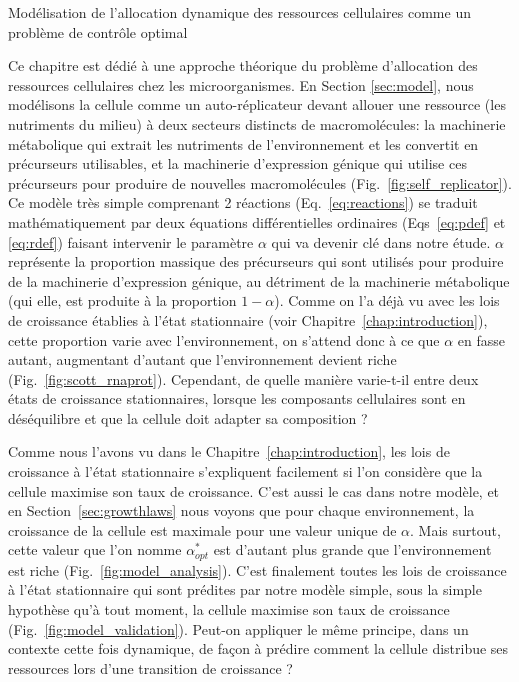 \begin{chapter_summary}{Modélisation de l'allocation dynamique des ressources cellulaires comme un problème de contrôle optimal}

Ce chapitre est dédié à une approche théorique du problème d'allocation des ressources cellulaires chez les microorganismes.
En Section \ref{sec:model}, nous modélisons la cellule comme un auto-réplicateur devant allouer une ressource (les nutriments du milieu) à deux secteurs distincts de macromolécules: la machinerie métabolique qui extrait les nutriments de l'environnement et les convertit en précurseurs utilisables, et la machinerie d'expression génique qui utilise ces précurseurs pour produire de nouvelles macromolécules (Fig.~\ref{fig:self_replicator}).
Ce modèle très simple comprenant 2 réactions (Eq.~\ref{eq:reactions}) se traduit mathématiquement par deux équations différentielles ordinaires (Eqs~\ref{eq:pdef} et \ref{eq:rdef}) faisant intervenir le paramètre $\alpha$ qui va devenir clé dans notre étude.
$\alpha$ représente la proportion massique des précurseurs qui sont utilisés pour produire de la machinerie d'expression génique, au détriment de la machinerie métabolique (qui elle, est produite à la proportion $1-\alpha$).
Comme on l'a déjà vu avec les lois de croissance établies à l'état stationnaire (voir Chapitre~\ref{chap:introduction}), cette proportion varie avec l'environnement, on s'attend donc à ce que $\alpha$ en fasse autant, augmentant d'autant que l'environnement devient riche (Fig.~\ref{fig:scott_rnaprot}).
Cependant, de quelle manière varie-t-il entre deux états de croissance stationnaires, lorsque les composants cellulaires sont en déséquilibre et que la cellule doit adapter sa composition ?

Comme nous l'avons vu dans le Chapitre~\ref{chap:introduction}, les lois de croissance à l'état stationnaire s'expliquent facilement si l'on considère que la cellule maximise son taux de croissance.
C'est aussi le cas dans notre modèle, et en Section~\ref{sec:growthlaws} nous voyons que pour chaque environnement, la croissance de la cellule est maximale pour une valeur unique de $\alpha$.
Mais surtout, cette valeur que l'on nomme $\alpha^*_{opt}$ est d'autant plus grande que l'environnement est riche (Fig.~\ref{fig:model_analysis}).
C'est finalement toutes les lois de croissance à l'état stationnaire qui sont prédites par notre modèle simple, sous la simple hypothèse qu'à tout moment, la cellule maximise son taux de croissance (Fig.~\ref{fig:model_validation}).
Peut-on appliquer le même principe, dans un contexte cette fois dynamique, de façon à prédire comment la cellule distribue ses ressources lors d'une transition de croissance ?


\end{chapter_summary}
